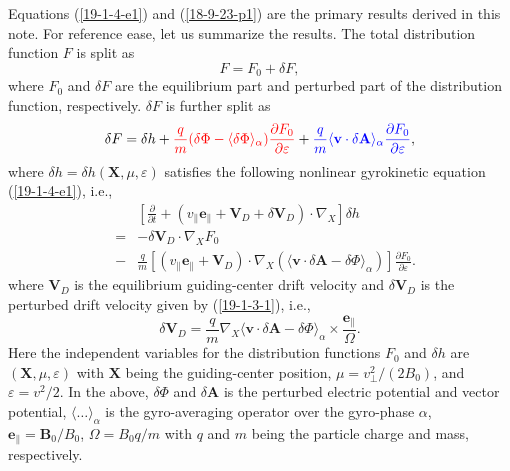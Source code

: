 \documentclass{article}
\newcommand{\tmcolor}[2]{{\color{#1}{#2}}}
\begin{document}
Equations (\ref{19-1-4-e1}) and (\ref{18-9-23-p1}) are the primary results
derived in this note. For reference ease, let us summarize the results. The
total distribution function $F$ is split as
\begin{equation}
  \label{19-1-4-6m} F = F_0 + \delta F,
\end{equation}
where $F_0$ and $\delta F$ are the equilibrium part and perturbed part of the
distribution function, respectively. $\delta F$ is further split as
\begin{equation}
  \label{19-1-3-e2m} \delta F = \delta h + \tmcolor{red}{\frac{q}{m} (\delta
  \Phi - \langle \delta \Phi \rangle_{\alpha}) \frac{\partial F_0}{\partial
  \varepsilon}} + \tmcolor{blue}{\frac{q}{m} \langle \mathbf{v} \cdot \delta
  \mathbf{A} \rangle_{\alpha} \frac{\partial F_0}{\partial \varepsilon}},
\end{equation}
where $\delta h = \delta h (\mathbf{X}, \mu, \varepsilon)$ satisfies the
following nonlinear gyrokinetic equation (\ref{19-1-4-e1}), i.e.,
\begin{eqnarray}
  &  & \left[ \frac{\partial}{\partial t} + (v_{\parallel}
  \mathbf{e}_{\parallel} +\mathbf{V}_D + \delta \mathbf{V}_D) \cdot \nabla_X
  \right] \delta h \nonumber\\
  & = & - \delta \mathbf{V}_D \cdot \nabla_X F_0 \nonumber\\
  & - & \frac{q}{m} [(v_{\parallel} \mathbf{e}_{\parallel} +\mathbf{V}_D)
  \cdot \nabla_X (\langle \mathbf{v} \cdot \delta \mathbf{A}- \delta \Phi
  \rangle_{\alpha})] \frac{\partial F_0}{\partial \varepsilon} . 
  \label{19-1-4-e1m}
\end{eqnarray}
where $\mathbf{V}_D$ is the equilibrium guiding-center drift velocity and
$\delta \mathbf{V}_D$ is the perturbed drift velocity given by
(\ref{19-1-3-1}), i.e.,
\begin{equation}
  \label{19-1-3-1m} \delta \mathbf{V}_D = \frac{q}{m} \nabla_X \langle
  \mathbf{v} \cdot \delta \mathbf{A}- \delta \Phi \rangle_{\alpha} \times
  \frac{\mathbf{e}_{\parallel}}{\Omega} .
\end{equation}
Here the independent variables for the distribution functions $F_0$ and
$\delta h$ are $(\mathbf{X}, \mu, \varepsilon)$ with $\mathbf{X}$ being the
guiding-center position, $\mu = v_{\perp}^2 / (2 B_0)$, and $\varepsilon = v^2
/ 2$. In the above, $\delta \Phi$ and $\delta \mathbf{A}$ is the perturbed
electric potential and vector potential, $\langle \ldots \rangle_{\alpha}$ is
the gyro-averaging operator over the gyro-phase $\alpha$, \
$\mathbf{e}_{\parallel} =\mathbf{B}_0 / B_0$, $\Omega = B_0 q / m$ with $q$
and $m$ being the particle charge and mass, respectively.
\end{document}
